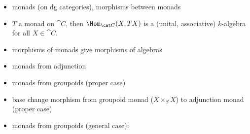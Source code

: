 \begin{itemize}
    \item monads (on dg categories), morphisms between monads
    \item $T$ a monad on $\cat C$, then $\Hom_{\cat C}(X, TX)$ is a (unital, associative) $k$-algebra for all $X ∈ \cat C$.
    \item morphisms of monads give morphisms of algebras
    \item monads from adjunction
    \item monads from groupoids (proper case)
    \item base change morphism from groupoid monad ($X ×_S X$) to adjunction monad (proper case)
    \item monads from groupoids (general case): \cite[Lemma~II.1.7.1.4]{GaitsgoryRozenblyum:prelim:StudyInDAG}
\end{itemize}

